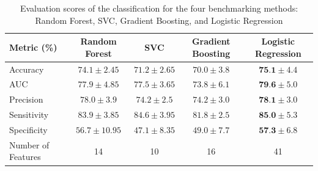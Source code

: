 \documentclass[final,british,a4paper,12pt]{phdthesis}
\begin{document}




  

\begin{table}[htb]
\centering
\captionsetup{justification=centering}  %
\caption{Evaluation scores of the classification for the four benchmarking methods: Random Forest, SVC, Gradient Boosting, and Logistic Regression}
\label{table:1}
\small
\begin{tabular}{@{}lcccc@{}}  %
\toprule
\textsf{Metric (\%)} & \textsf{Random Forest} & \textsf{SVC} & \textsf{Gradient Boosting} & \textsf{Logistic Regression} \\
\midrule
Accuracy           & $74.1 \pm 2.45$ & $71.2 \pm 2.65$ & $70.0 \pm 3.8$ & $\textbf{75.1} \pm 4.4$ \\
AUC                & $77.9 \pm 4.85$ & $77.5 \pm 3.65$ & $73.8 \pm 6.1$ & $\textbf{79.6} \pm 5.0$ \\
Precision          & $78.0 \pm 3.9$ & $74.2 \pm 2.5$ & $74.2 \pm 3.0$ & $\textbf{78.1} \pm 3.0$ \\
Sensitivity        & $83.9 \pm 3.85$ & $84.6 \pm 3.95$ & $81.8 \pm 2.5$ & $\textbf{85.0} \pm 5.3$ \\
Specificity        & $56.7 \pm 10.95$ & $47.1 \pm 8.35$ & $49.0 \pm 7.7$ & $\textbf{57.3} \pm 6.8$ \\
\midrule
Number of Features & 14   & 10   & 16   & 41 \\
\bottomrule
\end{tabular}
\end{table}
\end{document}
